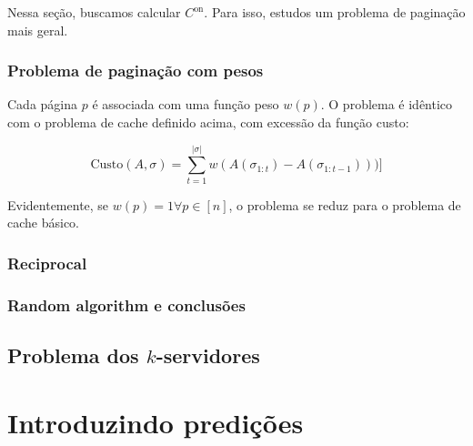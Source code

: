 \documentclass[a4paper,oneside,reqno,12pt]{amsart}
\begin{document}
Nessa seção, buscamos calcular $C^{\text{on}}$. Para isso, estudos um problema de paginação mais geral.

\subsubsection{Problema de paginação com pesos}

Cada página $p$ é associada com uma função peso $w(p)$. O problema é idêntico com o problema de cache definido acima, com excessão da função custo:

\[
  \text{Custo}(A, \sigma) = \sum_{t=1}^{|\sigma|} w(A(\sigma_{1:t}) - A(\sigma_{1:t-1})))]
\]

Evidentemente, se $w(p) = 1 \forall p \in [n]$, o problema se reduz para o problema de cache básico.

\subsubsection{Reciprocal}

\subsubsection{Random algorithm e conclusões}

\subsection{Problema dos $k$-servidores}

\section{Introduzindo predições}

\begingroup
{}
\printbibliography
\endgroup

\normalsize





\end{document}

